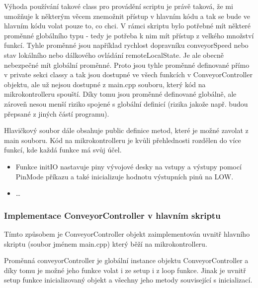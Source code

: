 Výhoda používání takové class pro provádění scriptu je právě taková, že mi umožňuje k některým věcem znemožnit přístup v hlavním kódu a tak se bude ve hlavním kódu volat pouze to, co chci. V rámci skriptu bylo potřebné mít některé proměnné globálního typu - tedy je potřeba k nim mít přístup z velkého množství funkcí. Tyhle proměnné jsou například rychlost dopravníku conveyorSpeed nebo stav lokálního nebo dálkového ovládání remoteLocalState. Je ale obecně nebezpečné mít globální proměnné. Proto jsou tyhle proměnné definované přímo v private sekci classy a tak jsou dostupné ve všech funkcích v ConveyorController objektu, ale už nejsou dostupné z main.cpp souboru, který kód na mikrokontrolleru spouští. Díky tomu jsou proměnné definované globálně, ale zároveň nesou menší riziko spojené s globální definicí (rizika jakože např. budou přepsané z jiných částí programu).

Hlavičkový soubor dále obsahuje public definice metod, které je možné zavolat z main souboru. Kód na mikrokontrolleru je kvůli přehlednosti rozdělen do více funkcí, kde každá funkce má svůj účel.

\begin{itemize}
    \item Funkce initIO nastavuje piny vývojové desky na vstupy a výstupy pomocí PinMode příkazu a také inicializuje hodnotu výstupních pinů na LOW.
    \item \dots
\end{itemize}

\subsubsection{Implementace ConveyorController v hlavním skriptu}\label{sec:ImplementaceConveyorControllerVeMainCpp}

Tímto způsobem je ConveyorController objekt zaimplementován uvnitř hlavního skriptu (soubor jménem main.cpp) který běží na mikrokontrolleru.



Proměnná conveyorController je globální instance objektu ConveyorController a díky tomu je možné jeho funkce volat i ze setup i z loop funkce. Jinak je uvnitř setup funkce inicializovaný objekt a všechny jeho metody související s inicializací. 

